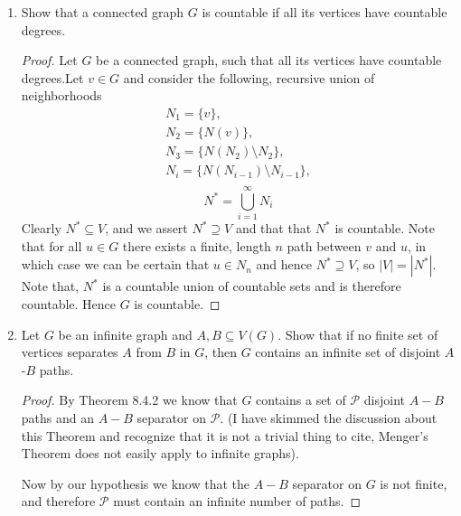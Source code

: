 \documentclass[12pt]{article}
\begin{document}
\begin{enumerate}
\begin{enumerate}
	\item Show that the hypothesis in part (b) is weaker than the hypothesis in Dirac's Theorem.
	\end{enumerate}
	\begin{proof} Suppose a graph $G$ with $n \geq 3$ vertices and $\delta(G) \geq \frac{n}{2}$. Well clearly for any pair of vertices $u, v$ (not just the non adjacent ones) we have that, 
	\begin{equation*}
		d(u) + d(v) \geq \delta(G) + \delta(G) = n.
	\end{equation*}
	\end{proof}
	\newpage
	
	
	
	\item Show that a connected graph $G$ is countable if all its vertices have countable degrees.
	\begin{proof} Let $G$ be a connected graph, such that all its vertices have countable degrees.Let $v \in G$ and consider the following, recursive union of neighborhoods
		\begin{align*}
			N_1 = \{v\},\\
			N_2 = \{N(v)\},\\
			N_3 = \{N(N_2) \setminus N_2\},\\
			N_i = \{N(N_{i - 1}) \setminus N_{i - 1}\},\\
		\end{align*}
		\begin{equation*}
			N^* = \bigcup_{i = 1}^\infty N_i
		\end{equation*}
		Clearly $N^* \subseteq V$, and we assert $N^* \supseteq V$ and that that $N^*$ is countable. Note that for all $u \in G$ there exists a finite, length  $n$ path between $v$ and $u$, in which case we can be certain that $u \in N_n$ and hence $N^* \supseteq V$, so $|V| = |N^*|$. Note that, $N^*$ is a countable union of countable sets and is therefore countable. Hence $G$ is countable. 
	\end{proof}
	\newpage
	
	
	
	
	
	\item Let $G$ be an infinite graph and $A,B \subseteq V(G).$ Show that if no finite set of vertices separates $A$ from $B$ in $G$, then $G$ contains an infinite set of disjoint $A$-$B$ paths.
	\begin{proof} By Theorem 8.4.2 we know that $G$ contains a set of $\mathcal{P}$ disjoint $A-B$ paths and an $A-B$ separator on $\mathcal{P}$. (I have skimmed the discussion about this Theorem and recognize that it is not a trivial thing to cite, Menger's Theorem does not easily apply to infinite graphs).

	Now by our hypothesis we know that the $A-B$ separator on $G$ is not finite, and therefore $\mathcal{P}$ must contain an infinite number of paths. 
		
	\end{proof}
	






\end{enumerate}
\end{document}
